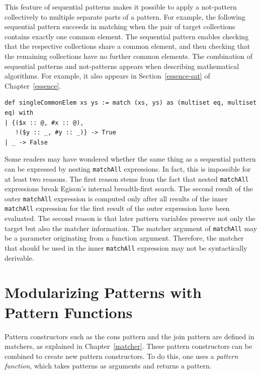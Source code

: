This feature of sequential patterns makes it possible to apply a not-pattern collectively to multiple separate parts of a pattern.
For example, the following sequential pattern succeeds in matching when the pair of target collections contains exactly one common element.
The sequential pattern enables checking that the respective collections share a common element, and then checking that the remaining collections have no further common elements.
The combination of sequential patterns and not-patterns appears when describing mathematical algorithms.
For example, it also appears in Section~\ref{essence-sat} of Chapter~\ref{essence}.
\begin{lstlisting}[language=egison,numbers=none]
def singleCommonElem xs ys := match (xs, ys) as (multiset eq, multiset eq) with
| {($x :: @, #x :: @),
   !($y :: _, #y :: _)} -> True
| _ -> False
\end{lstlisting}

Some readers may have wondered whether the same thing as a sequential pattern can be expressed by nesting \lstinline{matchAll} expressions.
In fact, this is impossible for at least two reasons.
The first reason stems from the fact that nested \lstinline{matchAll} expressions break Egison's internal breadth-first search.
The second result of the outer \lstinline{matchAll} expression is computed only after all results of the inner \lstinline{matchAll} expression for the first result of the outer expression have been evaluated.
The second reason is that later pattern variables preserve not only the target but also the matcher information.
The matcher argument of \lstinline{matchAll} may be a parameter originating from a function argument.
Therefore, the matcher that should be used in the inner \lstinline{matchAll} expression may not be syntactically derivable.


\section{Modularizing Patterns with Pattern Functions}\label{quick-pat-fun}

Pattern constructors such as the cons pattern and the join pattern are defined in matchers, as explained in Chapter~\ref{matcher}.
These pattern constructors can be combined to create new pattern constructors.
To do this, one uses a \emph{pattern function}, which takes patterns as arguments and returns a pattern.


